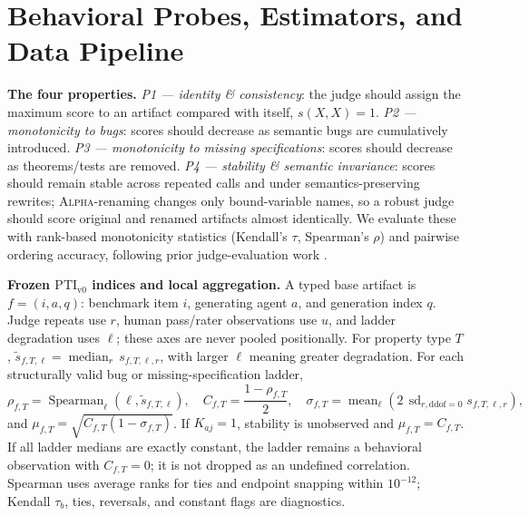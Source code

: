\documentclass{article}
\newcommand{\PTI}{\mathrm{PTI}}                  %
\newcommand{\PTIvzero}{\PTI_{\mathrm{v0}}}        %
\begin{document}
\section{Behavioral Probes, Estimators, and Data Pipeline}\label{sec:probes}

\textbf{The four properties.}
\emph{P1 --- identity \& consistency}: the judge should assign the maximum score to an artifact compared with itself, $s(X,X)=1$.
\emph{P2 --- monotonicity to bugs}: scores should decrease as semantic bugs are cumulatively introduced.
\emph{P3 --- monotonicity to missing specifications}: scores should decrease as theorems/tests are removed.
\emph{P4 --- stability \& semantic invariance}: scores should remain stable across repeated calls and under semantics-preserving rewrites; \textsc{Alpha}-renaming changes only bound-variable names, so a robust judge should score original and renamed artifacts almost identically.
We evaluate these with rank-based monotonicity statistics (Kendall's $\tau$, Spearman's $\rho$) and pairwise ordering accuracy, following prior judge-evaluation work \citep{TongZhang2024CodeJudge,Zhuo2024ICEScore}.

\textbf{Frozen $\PTIvzero$ indices and local aggregation.}
A typed base artifact is $f=(i,a,q)$: benchmark item $i$, generating agent $a$, and generation index $q$. Judge repeats use $r$, human pass/rater observations use $u$, and ladder degradation uses $\ell$; these axes are never pooled positionally. For property type $T$,
$\widetilde s_{f,T,\ell}=\operatorname{median}_{r}\,s_{f,T,\ell,r}$, with larger $\ell$ meaning greater degradation. For each structurally valid bug or missing-specification ladder,
\begin{equation}
\rho_{f,T}=\operatorname{Spearman}_{\ell}(\ell,\widetilde s_{f,T,\ell}),\quad
C_{f,T}=\frac{1-\rho_{f,T}}{2},\quad
\sigma_{f,T}=\operatorname{mean}_{\ell}\!\left(2\,\operatorname{sd}_{r,\mathrm{ddof}=0}s_{f,T,\ell,r}\right),
\label{eq:pti-ladder}
\end{equation}
and $\mu_{f,T}=\sqrt{C_{f,T}(1-\sigma_{f,T})}$. If $K_{aj}=1$, stability is unobserved and $\mu_{f,T}=C_{f,T}$. If all ladder medians are exactly constant, the ladder remains a behavioral observation with $C_{f,T}=0$; it is not dropped as an undefined correlation. Spearman uses average ranks for ties and endpoint snapping within $10^{-12}$; Kendall $\tau_b$, ties, reversals, and constant flags are diagnostics.
\end{document}
